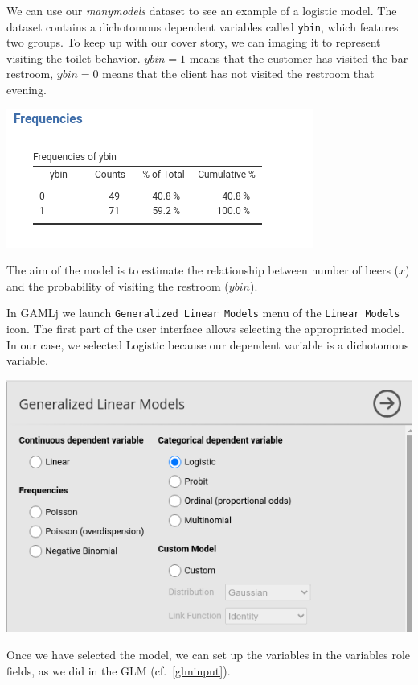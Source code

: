 \documentclass[
]{book}
\begin{document}
We can use our \emph{manymodels} dataset to see an example of a logistic model. The dataset contains a dichotomous dependent variables called \texttt{ybin}, which features two groups. To keep up with our cover story, we can imaging it to represent visiting the toilet behavior. \(ybin=1\) means that the customer has visited the bar restroom, \(ybin=0\) means that the client has not visited the restroom that evening.

\includegraphics{bookletpics/3_logistic_freq1.png}

The aim of the model is to estimate the relationship between number of beers (\(x\)) and the probability of visiting the restroom (\(ybin\)).

In {GAMLj} we launch \texttt{Generalized\ Linear\ Models} menu of the \texttt{Linear\ Models} icon. The first part of the user interface allows selecting the appropriated model. In our case, we selected {Logistic} because our dependent variable is a dichotomous variable.

\includegraphics[width=0.9\linewidth]{bookletpics/3_logistic_input1}

Once we have selected the model, we can set up the variables in the variables role fields, as we did in the GLM (cf.~\ref{glminput}).
\end{document}
